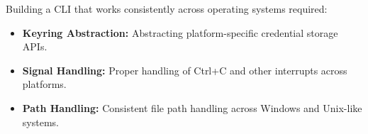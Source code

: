 Building a CLI that works consistently across operating systems required:

\begin{itemize}
    \item \textbf{Keyring Abstraction:} Abstracting platform-specific credential storage APIs.
    \item \textbf{Signal Handling:} Proper handling of Ctrl+C and other interrupts across platforms.
    \item \textbf{Path Handling:} Consistent file path handling across Windows and Unix-like systems.
\end{itemize}






